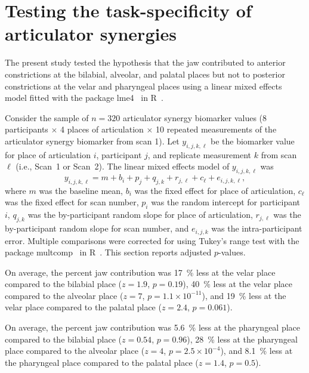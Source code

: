 \documentclass[preprint]{JASAnew}\usepackage[]{graphicx}\usepackage[]{color}
\begin{document}
\section{Testing the task-specificity of articulator synergies}
\label{sec:taskspec}

The present study tested the hypothesis that the jaw contributed to anterior constrictions at the bilabial, alveolar, and palatal places but not to posterior constrictions at the velar and pharyngeal places using a linear mixed effects model fitted with the package lme4~\citep{bates2015fitting} in R~\citep{r2017language}. 


Consider the sample of $n=320$ articulator synergy biomarker values (\num{8} participants $\times$ \num{4} places of articulation $\times$ \num{10} repeated measurements of the articulator synergy biomarker from scan \num{1}). Let $y_{i,j,k,\ell}$ be the biomarker value for place of articulation $i$, participant $j$, and replicate measurement $k$ from scan $\ell$ (i.e., Scan~\num{1} or Scan~\num{2}). The linear mixed effects model of $y_{i,j,k,\ell}$ was 
%
\begin{equation}
y_{i,j,k,\ell} = m + b_i + p_j + q_{j,k} + r_{j,\ell} + c_\ell + e_{i,j,k,\ell},
\end{equation}
%
where $m$ was the baseline mean, $b_i$ was the fixed effect for place of articulation, $c_\ell$ was the fixed effect for scan number, $p_i$ was the random intercept for participant $i$, $q_{j,k}$ was the by-participant random slope for place of articulation, $r_{j,\ell}$ was the by-participant random slope for scan number, and $e_{i,j,k}$ was the intra-participant error. Multiple comparisons were corrected for using Tukey's range test with the package multcomp~\citep{hothorn2008simultaneous} in R~\citep{r2017language}. This section reports adjusted $p$-values. 

%
On average, the percent jaw contribution was 
%
%
\SI{17}{\percent} 
less at the velar place compared to the bilabial place
($z=1.9$, 
$p=0.19$),
%
%
\SI{40}{\percent} 
less at the velar place compared to the alveolar place
($z=7$, 
$p=\ensuremath{1.1\times 10^{-11}}$), and
%
%
\SI{19}{\percent} 
less at the velar place compared to the palatal place
($z=2.4$, 
$p=0.061$).




%
On average, the percent jaw contribution was 
%
%
\SI{5.6}{\percent} 
less at the pharyngeal place compared to the bilabial place
($z=0.54$, 
$p=0.96$),
%
%
\SI{28}{\percent} 
less at the pharyngeal place compared to the alveolar place
($z=4$, 
$p=\ensuremath{2.5\times 10^{-4}}$), and
%
%
\SI{8.1}{\percent} 
less at the pharyngeal place compared to the palatal place
($z=1.4$, 
$p=0.5$).
\end{document}
